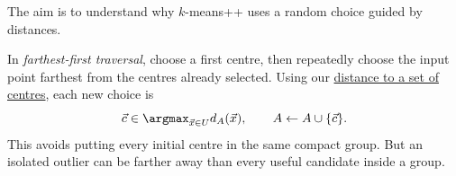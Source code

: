 \documentclass[a4paper,12pt,oneside]{report}
\begin{document}
The aim is to understand why $k$-means++ uses a random choice
guided by distances.

In \emph{farthest-first traversal}, choose a first centre, then
repeatedly choose the input point farthest from the centres already
selected. Using our \hyperref[def:distance-centres]{distance to a
set of centres}, each new choice is
\[
  \vec c\in\argmax_{\vec x\in U}d_A(\vec x),\qquad
  A\gets A\cup\{\vec c\}.
\]
This avoids putting every initial centre in the same compact group.
But an isolated outlier can be farther away than every useful
candidate inside a group.

\begingroup
{}
\newcommand{\ffoutlierplot}[1]{%
\begin{center}
\begin{tikzpicture}[x=1.15cm,y=1cm,
  rep/.style={diamond,fill=##1,draw=black,thick,inner sep=2.4pt},
  mass/.style={circle,fill=##1,draw=black,inner sep=4pt}]
  \path[use as bounding box] (-1.2,-0.9) rectangle (11.2,1.2);
  \draw[gray] (-.5,0)--(10.6,0);
  \ifnum#1=1
    \hull{ClA}{(0,0)--(4,0)}
    \node[mass=ClA] at (0,0) {};
    \node[mass=ClA] at (4,0) {};
    \node[clpt=ClB] at (10,0) {};
    \foreach \x/\col in {2/ClA,10/ClB}{
      \draw[\col,densely dotted] (\x,0)--(\x,0.65);
      \node[rep=\col,label=above:{centre $\x$}] at (\x,0.65) {};}
  \else
    \node[mass=ClA] at (0,0) {};
    \node[mass=ClB] at (4,0) {};
    \ifnum#1=0
      \node[clpt=gray] at (10,0) {};
    \else
      \hull{ClB}{(4,0)--(10,0)}
      \node[mass=ClB] at (4,0) {};
      \node[clpt=ClB] at (10,0) {};
      \foreach \x/\col in {0/ClA,4/ClB}{
        \draw[\col,densely dotted] (\x,0)--(\x,0.65);
        \node[rep=\col,label=above:{centre $\x$}] at (\x,0.65) {};}
    \fi
  \fi
  \foreach \x in {0,4,10}
    \node[font=\small,below=6pt] at (\x,0) {$\x$};
  \foreach \x in {0,4}
    \node[font=\small,below=22pt] at (\x,0) {10 points};
  \node[font=\small,below=22pt] at (10,0) {1 point};
\end{tikzpicture}
\end{center}}
\end{document}
